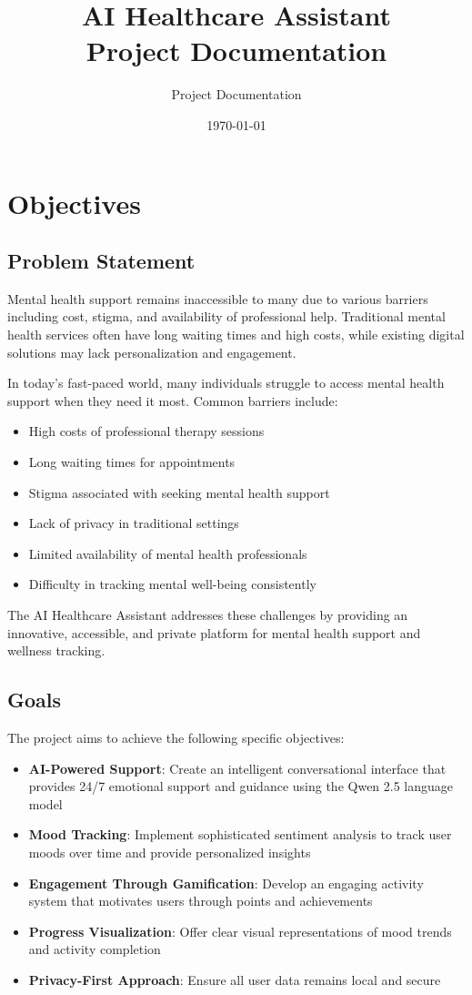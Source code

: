\documentclass[12pt]{article}
\title{AI Healthcare Assistant\\Project Documentation}
\author{Project Documentation}
\date{\today}
\begin{document}
\maketitle
\tableofcontents
\newpage

\section{Objectives}

\subsection{Problem Statement}
Mental health support remains inaccessible to many due to various barriers including cost, stigma, and availability of professional help. Traditional mental health services often have long waiting times and high costs, while existing digital solutions may lack personalization and engagement.

In today's fast-paced world, many individuals struggle to access mental health support when they need it most. Common barriers include:
\begin{itemize}
    \item High costs of professional therapy sessions
    \item Long waiting times for appointments
    \item Stigma associated with seeking mental health support
    \item Lack of privacy in traditional settings
    \item Limited availability of mental health professionals
    \item Difficulty in tracking mental well-being consistently
\end{itemize}

The AI Healthcare Assistant addresses these challenges by providing an innovative, accessible, and private platform for mental health support and wellness tracking.

\subsection{Goals}
The project aims to achieve the following specific objectives:

\begin{itemize}
    \item \textbf{AI-Powered Support}: Create an intelligent conversational interface that provides 24/7 emotional support and guidance using the Qwen 2.5 language model
    \item \textbf{Mood Tracking}: Implement sophisticated sentiment analysis to track user moods over time and provide personalized insights
    \item \textbf{Engagement Through Gamification}: Develop an engaging activity system that motivates users through points and achievements
    \item \textbf{Progress Visualization}: Offer clear visual representations of mood trends and activity completion
    \item \textbf{Privacy-First Approach}: Ensure all user data remains local and secure
\end{itemize}
\end{document}
